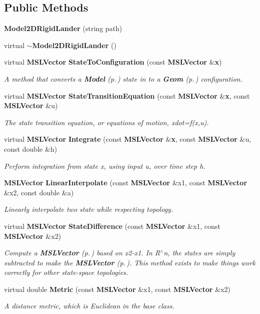 \subsection*{Public Methods}
\begin{CompactItemize}
\item 
{\bf Model2DRigid\-Lander} (string path)
\item 
virtual {\bf $\sim$Model2DRigid\-Lander} ()
\item 
virtual {\bf MSLVector} {\bf State\-To\-Configuration} (const {\bf MSLVector} \&{\bf x})
\begin{CompactList}\small\item\em A method that converts a {\bf Model} {\rm (p.\,\pageref{classModel})} state in to a {\bf Geom} {\rm (p.\,\pageref{classGeom})} configuration.\item\end{CompactList}\item 
virtual {\bf MSLVector} {\bf State\-Transition\-Equation} (const {\bf MSLVector} \&{\bf x}, const {\bf MSLVector} \&u)
\begin{CompactList}\small\item\em The state transition equation, or equations of motion, xdot=f(x,u).\item\end{CompactList}\item 
virtual {\bf MSLVector} {\bf Integrate} (const {\bf MSLVector} \&{\bf x}, const {\bf MSLVector} \&u, const double \&h)
\begin{CompactList}\small\item\em Perform integration from state x, using input u, over time step h.\item\end{CompactList}\item 
{\bf MSLVector} {\bf Linear\-Interpolate} (const {\bf MSLVector} \&x1, const {\bf MSLVector} \&x2, const double \&a)
\begin{CompactList}\small\item\em Linearly interpolate two state while respecting topology.\item\end{CompactList}\item 
virtual {\bf MSLVector} {\bf State\-Difference} (const {\bf MSLVector} \&x1, const {\bf MSLVector} \&x2)
\begin{CompactList}\small\item\em Compute a {\bf MSLVector} {\rm (p.\,\pageref{classMSLVector})} based on x2-x1. In R$^\wedge$n, the states are simply subtracted to make the {\bf MSLVector} {\rm (p.\,\pageref{classMSLVector})}. This method exists to make things work correctly for other state-space topologies.\item\end{CompactList}\item 
virtual double {\bf Metric} (const {\bf MSLVector} \&x1, const {\bf MSLVector} \&x2)
\begin{CompactList}\small\item\em A distance metric, which is Euclidean in the base class.\item\end{CompactList}\end{CompactItemize}
